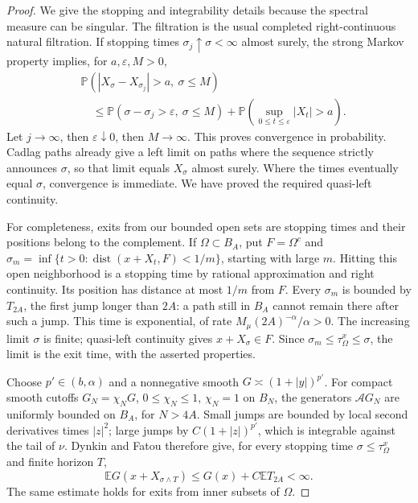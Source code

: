 \documentclass[11pt]{article}
\numberwithin{equation}{section}
\newcommand{\E}{\mathbb E}
\newcommand{\Prb}{\mathbb P}
\newcommand{\dist}{\operatorname{dist}}
\begin{document}
\begin{proof}
We give the stopping and integrability details because the spectral measure
can be singular. The filtration is the usual completed right-continuous
natural filtration. If stopping times \(\sigma_j\uparrow\sigma<\infty\) almost surely,
the strong Markov property implies, for \(a,\varepsilon,M>0\),
\begin{align*}
 &\Prb(|X_\sigma-X_{\sigma_j}|>a,\ \sigma\le M)\\
 &\quad\le\Prb(\sigma-\sigma_j>\varepsilon,\ \sigma\le M)
       +\Prb\left(\sup_{0\le t\le\varepsilon}|X_t|>a\right).
\end{align*}
Let \(j\to\infty\), then \(\varepsilon\downarrow0\), then \(M\to\infty\).
This proves convergence in probability. Cadlag paths already give a left
limit on paths where the sequence strictly announces \(\sigma\), so that
limit equals \(X_\sigma\) almost surely. Where the times eventually equal
\(\sigma\), convergence is immediate. We have proved the required
quasi-left continuity.

For completeness, exits from our bounded open sets are stopping times and
their positions belong to the complement. If \(\Omega\subset B_A\), put
\(F=\Omega^c\) and
\(\sigma_m=\inf\{t>0:\dist(x+X_t,F)<1/m\}\), starting with large \(m\).
Hitting this open neighborhood is a stopping time by rational approximation
and right continuity. Its position has distance at most \(1/m\) from \(F\).
Every \(\sigma_m\) is bounded by \(T_{2A}\), the first jump longer than
\(2A\): a path still in \(B_A\) cannot remain there after such a jump.
This time is exponential, of rate \(M_\mu(2A)^{-\alpha}/\alpha>0\).
The increasing limit \(\sigma\) is finite; quasi-left continuity gives
\(x+X_\sigma\in F\). Since \(\sigma_m\le\tau_\Omega^x\le\sigma\),
the limit is the exit time, with the asserted properties.

Choose \(p'\in(b,\alpha)\) and a nonnegative smooth
\(G\asymp(1+|y|)^{p'}\). For compact smooth cutoffs
\(G_N=\chi_NG\), \(0\le\chi_N\le1\), \(\chi_N=1\) on \(B_N\),
the generators \(\mathcal A G_N\) are uniformly bounded on \(B_A\), for \(N>4A\).
Small jumps are bounded by local second derivatives times \(|z|^2\);
large jumps by \(C(1+|z|)^{p'}\), which is integrable against the tail
of \(\nu\). Dynkin and Fatou therefore give, for every stopping time
\(\sigma\le\tau_\Omega^x\) and finite horizon \(T\),
\begin{equation}\label{eq:exit-moment}
 \E G(x+X_{\sigma\wedge T})
       \le G(x)+C\E T_{2A}<\infty.
\end{equation}
The same estimate holds for exits from inner subsets of \(\Omega\).


\end{proof}
\end{document}
